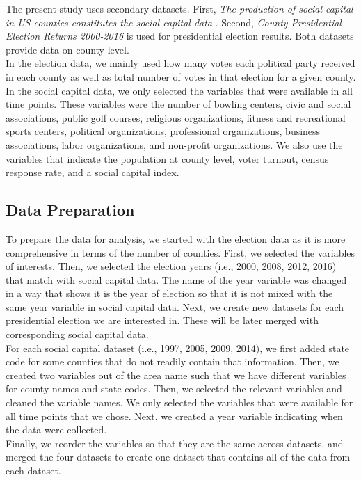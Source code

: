 \documentclass[
  english,
  man]{apa6}
\begin{document}
The present study uses secondary datasets. First, \emph{The production of social capital in US counties constitutes the social capital data} \autocite{rupasingha2006}. Second, \emph{County Presidential Election Returns 2000-2016} \autocite{data6science} is used for presidential election results. Both datasets provide data on county level.\\
In the election data, we mainly used how many votes each political party received in each county as well as total number of votes in that election for a given county.\\
In the social capital data, we only selected the variables that were available in all time points. These variables were the number of bowling centers, civic and social associations, public golf courses, religious organizations, fitness and recreational sports centers, political organizations, professional organizations, business associations, labor organizations, and non-profit organizations. We also use the variables that indicate the population at county level, voter turnout, census response rate, and a social capital index.

\hypertarget{data-preparation}{%
\subsection{Data Preparation}\label{data-preparation}}

To prepare the data for analysis, we started with the election data as it is more comprehensive in terms of the number of counties. First, we selected the variables of interests. Then, we selected the election years (i.e., 2000, 2008, 2012, 2016) that match with social capital data. The name of the year variable was changed in a way that shows it is the year of election so that it is not mixed with the same year variable in social capital data. Next, we create new datasets for each presidential election we are interested in. These will be later merged with corresponding social capital data.\\
For each social capital dataset (i.e., 1997, 2005, 2009, 2014), we first added state code for some counties that do not readily contain that information. Then, we created two variables out of the area name such that we have different variables for county names and state codes. Then, we selected the relevant variables and cleaned the variable names. We only selected the variables that were available for all time points that we chose. Next, we created a year variable indicating when the data were collected.\\
Finally, we reorder the variables so that they are the same across datasets, and merged the four datasets to create one dataset that contains all of the data from each dataset.
\end{document}
